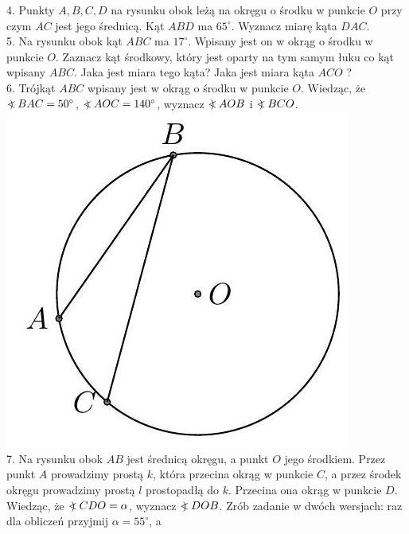 \documentclass[10pt]{article}
\newcommand\Varangle{\mathop{{<\!\!\!\!\!\text{\small)}}\:}\nolimits}
\begin{document}
4. Punkty \(A, B, C, D\) na rysunku obok leżą na okręgu o środku w punkcie \(O\) przy czym \(A C\) jest jego średnicą. Kąt \(A B D\) ma \(65^{\circ}\). Wyznacz miarę kąta \(D A C\).\\
5. Na rysunku obok kąt \(A B C\) ma \(17^{\circ}\). Wpisany jest on w okrąg o środku w punkcie \(O\). Zaznacz kąt środkowy, który jest oparty na tym samym łuku co kąt wpisany \(A B C\). Jaka jest miara tego kąta? Jaka jest miara kąta \(A C O\) ?\\
6. Trójkąt \(A B C\) wpisany jest w okrąg o środku w punkcie \(O\). Wiedząc, że \(\Varangle B A C=50^{\circ}\), \(\Varangle A O C=140^{\circ}\), wyznacz \(\Varangle A O B\) i \(\Varangle B C O\).\\
\includegraphics[max width=\textwidth, center]{2024_11_21_71f62bd117d375398909g-182(1)}\\
7. Na rysunku obok \(A B\) jest średnicą okręgu, a punkt \(O\) jego środkiem. Przez punkt \(A\) prowadzimy prostą \(k\), która przecina okrąg w punkcie \(C\), a przez środek okręgu prowadzimy prostą \(l\) prostopadłą do \(k\). Przecina ona okrąg w punkcie \(D\). Wiedząc, że \(\Varangle C D O=\alpha\), wyznacz \(\Varangle D O B\). Zrób zadanie w dwóch wersjach: raz dla obliczeń przyjmij \(\alpha=55^{\circ}\), a\\
\end{document}
